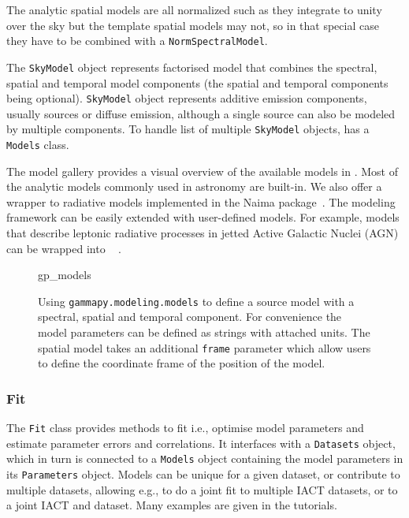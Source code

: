 \documentclass[traditabstract, longauth]{aa}
\newcommand{\code}[1]{\texttt{#1}}
\begin{document}
The analytic spatial models are all normalized such as they integrate to
unity over the sky but the template spatial models may not, so in that special
case they have to be combined with a \code{NormSpectralModel}.

The \code{SkyModel} object represents factorised model that combines the spectral,
spatial and temporal model components (the spatial and temporal components being
optional). \code{SkyModel} object represents additive emission components, usually
sources or diffuse emission, although a single source can also be modeled by
multiple components. To handle list of multiple \code{SkyModel} objects, \gammapy
has a \code{Models} class.

The model gallery provides a visual overview of the available models in
\gammapy. Most of the analytic models  commonly used in \gammaray astronomy are
built-in. We also offer a wrapper to radiative models implemented in the Naima
package~\citep{naima}. The modeling framework can be easily extended with
user-defined models. For example, \agnpy models that describe leptonic radiative
processes in jetted Active Galactic Nuclei (AGN) can be wrapped into
\gammapy~\citep[see Section 3.5 of ][]{2021arXiv211214573N} .

\begin{figure}
	\small
	{gp_models}
	\caption{Using \code{gammapy.modeling.models} to define a source model with a
    spectral, spatial and temporal component. For convenience the model
    parameters can be defined as strings with attached units. The spatial model
    takes an additional \code{frame} parameter which allow users to define
    the coordinate frame of the position of the model.
    }
	\label{fig*:minted:gp_models}
\end{figure}

\subsubsection{Fit}
\label{sssec:fit}

The \code{Fit} class provides methods to fit i.e., optimise model parameters and estimate
parameter errors and correlations. It interfaces with a \code{Datasets} object, which
in turn is connected to a \code{Models} object containing the model parameters in its
\code{Parameters} object. Models can be unique for a given dataset, or contribute to
multiple datasets, allowing e.g., to do a joint fit to
multiple IACT datasets, or to a joint IACT and \fermi dataset. Many
examples are given in the tutorials.
\end{document}
